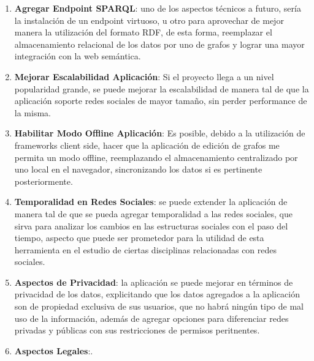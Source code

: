   \begin{enumerate}
    \item \textbf{Agregar Endpoint SPARQL}: uno de los aspectos técnicos a futuro, sería la instalación de un endpoint virtuoso, u otro para aprovechar de mejor manera la utilización del formato RDF, de esta forma, reemplazar el almacenamiento relacional de los datos por uno de grafos y lograr una mayor integración con la web semántica.
    
    \item \textbf{Mejorar Escalabilidad Aplicación}: Si el proyecto llega a un nivel popularidad grande, se puede mejorar la escalabilidad de manera tal de que la aplicación soporte redes sociales de mayor tamaño, sin perder performance de la misma.
    
    \item \textbf{Habilitar Modo Offline Aplicación}: Es posible, debido a la utilización de frameworks client side, hacer que la aplicación de edición de grafos me permita un modo offline, reemplazando el almacenamiento centralizado por uno local en el navegador, sincronizando los datos si es pertinente posteriormente.
    
    \item \textbf{Temporalidad en Redes Sociales}: se puede extender la aplicación de manera tal de que se pueda agregar temporalidad a las redes sociales, que sirva para analizar los cambios en las estructuras sociales con el paso del tiempo, aspecto que puede ser prometedor para la utilidad de esta herramienta en el estudio de ciertas disciplinas relacionadas con redes sociales.
    
    \item \textbf{Aspectos de Privacidad}: la aplicación se puede mejorar en términos de privacidad de los datos, explicitando que los datos agregados a la aplicación son de propiedad exclusiva de sus usuarios, que no habrá ningún tipo de mal uso de la información, además de agregar opciones para diferenciar redes privadas y públicas con sus restricciones de permisos peritnentes.
    
    \item \textbf{Aspectos Legales}:.
  \end{enumerate}

